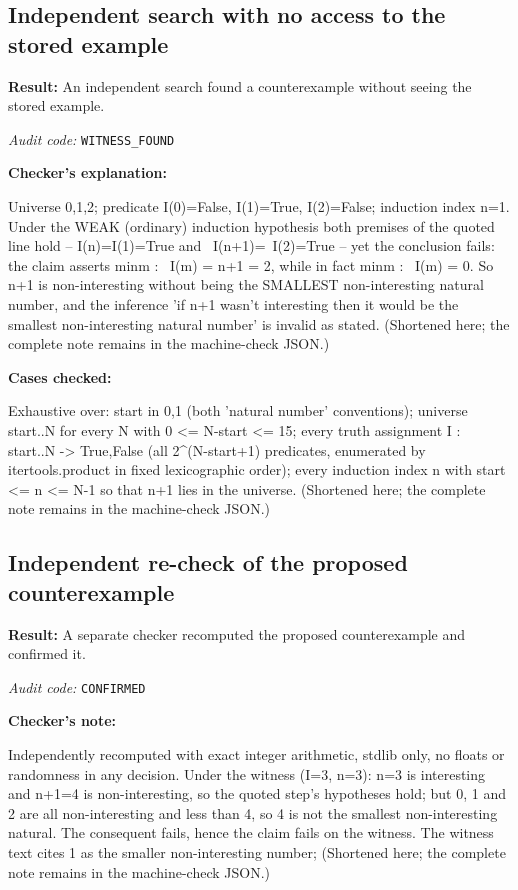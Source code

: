 \documentclass[11pt]{article}
\begin{document}
\subsection*{Independent search with no access to the stored example}
\textbf{Result:} An independent search found a counterexample without seeing the stored example.
\par\textit{Audit code:} \nolinkurl{WITNESS_FOUND}
\par\textbf{Checker's explanation:}
\begin{Vsrc}
Universe {0,1,2}; predicate I(0)=False, I(1)=True, I(2)=False; induction index n=1. Under the WEAK (ordinary) induction hypothesis both premises of the quoted line hold -- I(n)=I(1)=True and ~I(n+1)=~I(2)=True -- yet the conclusion fails: the claim asserts min{m : ~I(m)} = n+1 = 2, while in fact min{m : ~I(m)} = 0. So n+1 is non-interesting without being the SMALLEST non-interesting natural number, and the inference 'if n+1 wasn't interesting then it would be the smallest non-interesting natural number' is invalid as stated. (Shortened here; the complete note remains in the machine-check JSON.)
\end{Vsrc}
\par\textbf{Cases checked:}
\begin{Vsrc}
Exhaustive over: start in {0,1} (both 'natural number' conventions); universe {start..N} for every N with 0 <= N-start <= 15; every truth assignment I : {start..N} -> {True,False} (all 2^(N-start+1) predicates, enumerated by itertools.product in fixed lexicographic order); every induction index n with start <= n <= N-1 so that n+1 lies in the universe. (Shortened here; the complete note remains in the machine-check JSON.)
\end{Vsrc}
\subsection*{Independent re-check of the proposed counterexample}
\textbf{Result:} A separate checker recomputed the proposed counterexample and confirmed it.
\par\textit{Audit code:} \nolinkurl{CONFIRMED}
\par\textbf{Checker's note:}
\begin{Vsrc}
Independently recomputed with exact integer arithmetic, stdlib only, no floats or randomness in any decision. Under the witness (I={3}, n=3): n=3 is interesting and n+1=4 is non-interesting, so the quoted step's hypotheses hold; but 0, 1 and 2 are all non-interesting and less than 4, so 4 is not the smallest non-interesting natural. The consequent fails, hence the claim fails on the witness. The witness text cites 1 as the smaller non-interesting number; (Shortened here; the complete note remains in the machine-check JSON.)
\end{Vsrc}
\end{document}
